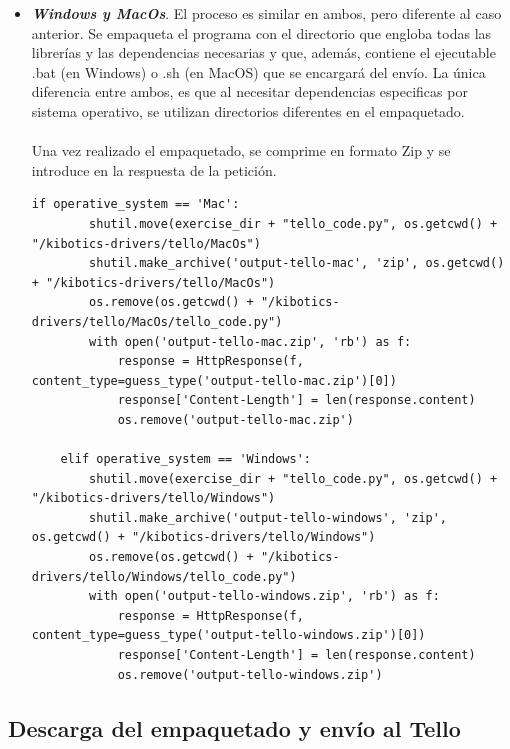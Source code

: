 \documentclass{report}
\begin{document}
\begin{itemize}
	\item \textit{\textbf{Windows y MacOs}}. El proceso es similar en ambos, pero diferente al caso anterior. Se empaqueta el programa con el directorio que engloba todas las librerías y las dependencias necesarias y que, además, contiene el ejecutable .bat (en Windows) o .sh (en MacOS) que se encargará del envío. La única diferencia entre ambos, es que al necesitar dependencias especificas por sistema operativo, se utilizan directorios diferentes en el empaquetado.
	\\
	\\
	Una vez realizado el empaquetado, se comprime en formato Zip y se introduce en la respuesta de la petición.
	\\
\begin{lstlisting}[frame=single,breaklines=true, label=Creación empaquetado y respuesta en Windows y MacOs, caption=Creación empaquetado y respuesta en Windows y MacOs,  captionpos=b]
   if operative_system == 'Mac':
        shutil.move(exercise_dir + "tello_code.py", os.getcwd() + "/kibotics-drivers/tello/MacOs")
        shutil.make_archive('output-tello-mac', 'zip', os.getcwd() + "/kibotics-drivers/tello/MacOs")
        os.remove(os.getcwd() + "/kibotics-drivers/tello/MacOs/tello_code.py")
        with open('output-tello-mac.zip', 'rb') as f:
            response = HttpResponse(f, content_type=guess_type('output-tello-mac.zip')[0])
            response['Content-Length'] = len(response.content)
            os.remove('output-tello-mac.zip')

    elif operative_system == 'Windows':
        shutil.move(exercise_dir + "tello_code.py", os.getcwd() + "/kibotics-drivers/tello/Windows")
        shutil.make_archive('output-tello-windows', 'zip', os.getcwd() + "/kibotics-drivers/tello/Windows")
        os.remove(os.getcwd() + "/kibotics-drivers/tello/Windows/tello_code.py")
        with open('output-tello-windows.zip', 'rb') as f:
            response = HttpResponse(f, content_type=guess_type('output-tello-windows.zip')[0])
            response['Content-Length'] = len(response.content)
            os.remove('output-tello-windows.zip')
\end{lstlisting}	

\end{itemize}

\subsection{Descarga del empaquetado y envío al Tello}
\end{document}
